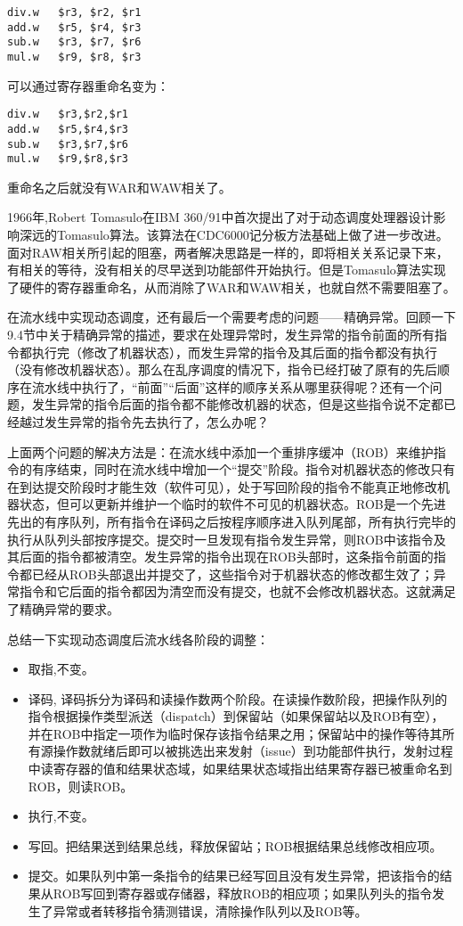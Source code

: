 \documentclass[]{ctexbook}
\providecommand{\tightlist}{%
  \setlength{\itemsep}{0pt}\setlength{\parskip}{0pt}}
\begin{document}
\begin{verbatim}
div.w   $r3, $r2, $r1
add.w   $r5, $r4, $r3
sub.w   $r3, $r7, $r6
mul.w   $r9, $r8, $r3
\end{verbatim}

可以通过寄存器重命名变为：

\begin{verbatim}
div.w   $r3,$r2,$r1
add.w   $r5,$r4,$r3
sub.w   $r3,$r7,$r6
mul.w   $r9,$r8,$r3
\end{verbatim}

重命名之后就没有WAR和WAW相关了。

1966年,Robert Tomasulo在IBM 360/91中首次提出了对于动态调度处理器设计影响深远的Tomasulo算法。该算法在CDC6000记分板方法基础上做了进一步改进。面对RAW相关所引起的阻塞，两者解决思路是一样的，即将相关关系记录下来，有相关的等待，没有相关的尽早送到功能部件开始执行。但是Tomasulo算法实现了硬件的寄存器重命名，从而消除了WAR和WAW相关，也就自然不需要阻塞了。

在流水线中实现动态调度，还有最后一个需要考虑的问题------精确异常。回顾一下9.4节中关于精确异常的描述，要求在处理异常时，发生异常的指令前面的所有指令都执行完（修改了机器状态），而发生异常的指令及其后面的指令都没有执行（没有修改机器状态）。那么在乱序调度的情况下，指令已经打破了原有的先后顺序在流水线中执行了，``前面''``后面''这样的顺序关系从哪里获得呢？还有一个问题，发生异常的指令后面的指令都不能修改机器的状态，但是这些指令说不定都已经越过发生异常的指令先去执行了，怎么办呢？

上面两个问题的解决方法是：在流水线中添加一个重排序缓冲（ROB）来维护指令的有序结束，同时在流水线中增加一个``提交''阶段。指令对机器状态的修改只有在到达提交阶段时才能生效（软件可见），处于写回阶段的指令不能真正地修改机器状态，但可以更新并维护一个临时的软件不可见的机器状态。ROB是一个先进先出的有序队列，所有指令在译码之后按程序顺序进入队列尾部，所有执行完毕的执行从队列头部按序提交。提交时一旦发现有指令发生异常，则ROB中该指令及其后面的指令都被清空。发生异常的指令出现在ROB头部时，这条指令前面的指令都已经从ROB头部退出并提交了，这些指令对于机器状态的修改都生效了；异常指令和它后面的指令都因为清空而没有提交，也就不会修改机器状态。这就满足了精确异常的要求。

总结一下实现动态调度后流水线各阶段的调整：

\begin{itemize}
\tightlist
\item
  取指,不变。
\item
  译码, 译码拆分为译码和读操作数两个阶段。在读操作数阶段，把操作队列的指令根据操作类型派送（dispatch）到保留站（如果保留站以及ROB有空），并在ROB中指定一项作为临时保存该指令结果之用；保留站中的操作等待其所有源操作数就绪后即可以被挑选出来发射（issue）到功能部件执行，发射过程中读寄存器的值和结果状态域，如果结果状态域指出结果寄存器已被重命名到ROB，则读ROB。
\item
  执行,不变。
\item
  写回。把结果送到结果总线，释放保留站；ROB根据结果总线修改相应项。
\item
  提交。如果队列中第一条指令的结果已经写回且没有发生异常，把该指令的结果从ROB写回到寄存器或存储器，释放ROB的相应项；如果队列头的指令发生了异常或者转移指令猜测错误，清除操作队列以及ROB等。
\end{itemize}
\end{document}
